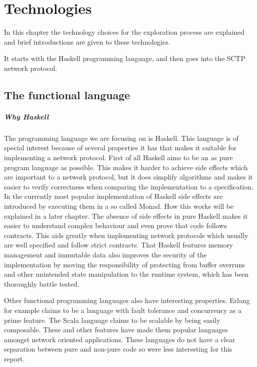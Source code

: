 \chapter{Technologies}
In this chapter the technology choices for the exploration process are explained and brief introductions are given to these technologies.

It starts with the Haskell programming language, and then goes into the SCTP network protocol.

\section{The functional language}
\paragraph{Why Haskell}
The programming language we are focusing on is Haskell.
This language is of special interest because of several properties it has that makes it suitable for implementing a network protocol.
First of all Haskell aims to be an as pure program language as possible. This makes it harder to achieve side effects which are important to a network protocol, but it does simplify algorithms and makes it easier to verify correctness when comparing the implementation to a specification.
In the currently most popular implementation of Haskell side effects are introduced by executing them in a so called Monad.
How this works will be explained in a later chapter.
The absence of side effects in pure Haskell makes it easier to understand complex behaviour and even prove that code follows contracts.
This aids greatly when implementing network protocols which usually are well specified and follow strict contracts.
That Haskell features memory management and immutable data also improves the security of the implementation by moving the responsibility of protecting from buffer overruns and other unintended state manipulation to the runtime system, which has been thoroughly battle tested.

Other functional programming languages also have interesting properties.
Erlang for example claims to be a language with fault tolerance and concurrency as a prime feature\cite{armstrong_concurrent_1993}.
The Scala language claims to be scalable by being easily composable\cite{odersky_overview_????}.
These and other features have made them popular languages amongst network oriented applications. %
These languages do not have a clear separation between pure and non-pure code so were less interesting for this report.
